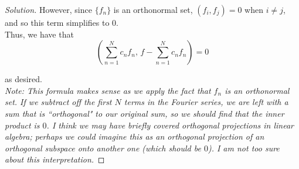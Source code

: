 \documentclass[11pt]{article}
\newenvironment{solution}
  {\renewcommand\qedsymbol{$\blacksquare$}\begin{proof}[Solution]}
  {\end{proof}}
\begin{document}
\begin{solution}
However, since $\{f_n\}$ is an orthonormal set, $(f_i, f_j) = 0$ when $i \neq j$, and so this term simplifies to $0$.\\

Thus, we have that \[ \left(\sum\limits_{n=1}^N c_n f_n, \, f  - \sum\limits_{n=1}^N c_nf_n \right) = 0\]

as desired. \\

\textit{Note: This formula makes sense as we apply the fact that $f_{n}$ is an orthonormal set. If we subtract off the first $N$ terms in the Fourier series, we are left with a sum that is ``orthogonal" to our original sum, so we should find that the inner product is $0$.   
I think we may have briefly covered orthogonal projections in linear algebra; perhaps we could
imagine this as an orthogonal projection of an orthogonal subspace onto another one (which should be $0$). I am not too sure about this interpretation. }
\end{solution}
\end{document}
